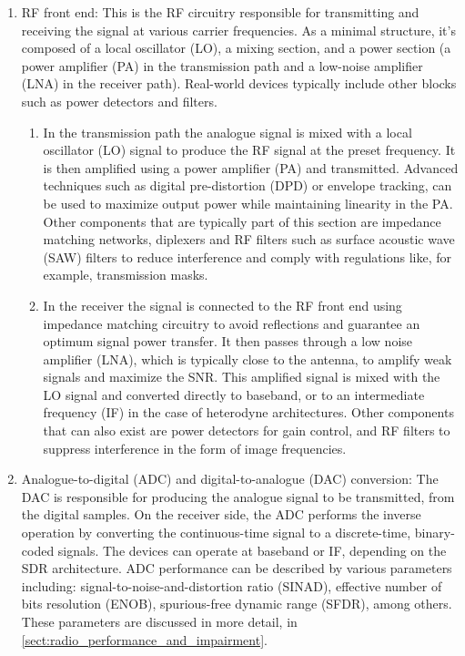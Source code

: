 \begin{enumerate}
  \item RF front end: This is the RF circuitry responsible for transmitting and receiving the signal at various carrier frequencies. As a minimal structure, it's composed of a local oscillator (LO), a mixing section, and a power section (a power amplifier (PA) in the transmission path and a low-noise amplifier (LNA) in the receiver path). Real-world devices typically include other blocks such as power detectors and filters.
  \begin{enumerate}
    \item In the transmission path the analogue signal is mixed with a local oscillator (LO) signal to produce the RF signal at the preset frequency. It is then amplified using a power amplifier (PA) and transmitted. Advanced techniques such as digital pre-distortion (DPD) or envelope tracking, can be used to maximize output power while maintaining linearity in the PA. Other components that are typically part of this section are impedance matching networks, diplexers and RF filters such as surface acoustic wave (SAW) filters to reduce interference and comply with regulations like, for example, transmission masks.
    \item In the receiver the signal is connected to the RF front end using impedance matching circuitry to avoid reflections and guarantee an optimum signal power transfer. It then passes through a low noise amplifier (LNA), which is typically close to the antenna, to amplify weak signals and maximize the SNR. This amplified signal is mixed with the LO signal and converted directly to baseband, or to an intermediate frequency (IF) in the case of heterodyne architectures\cite{tech_radio_handbook}. Other components that can also exist are power detectors for gain control, and RF filters to suppress interference in the form of image frequencies.
  \end{enumerate}

  \item Analogue-to-digital (ADC) and digital-to-analogue (DAC) conversion: The DAC is responsible for producing the analogue signal to be transmitted, from the digital samples. On the receiver side, the ADC performs the inverse operation by converting the continuous-time signal to a discrete-time, binary-coded signals. The devices can operate at baseband or IF, depending on the SDR architecture. ADC performance can be described by various parameters \cite{adc_survey} \cite{digital_frontend_sdr} including: signal-to-noise-and-distortion ratio (SINAD), effective number of bits resolution (ENOB), spurious-free dynamic range (SFDR), among others. These parameters are discussed in more detail, in \autoref{sect:radio_performance_and_impairment}.


\end{enumerate}
